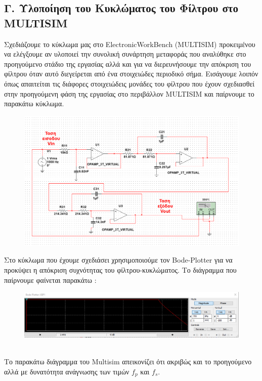 \documentclass{article}
\begin{document}
{\subsection*{Γ. Υλοποίηση του Κυκλώματος του Φίλτρου στο MULTISIM}
\large{}
Σχεδιάζουμε το κύκλωμα μας στο ElectronicWorkBench (MULTISIM) προκειμένου να ελέγξουμε αν υλοποιεί την συνολική συνάρτηση μεταφοράς που αναλύθηκε στο προηγούμενο στάδιο της εργασίας αλλά και για να διερευνήσουμε την απόκριση του φίλτρου όταν αυτό διεγείρεται από ένα στοιχειώδες περιοδικό σήμα.
Εισάγουμε λοιπόν όπως απαιτείται τις διάφορες στοιχειώδεις μονάδες του φίλτρου που έχουν σχεδιασθεί στην προηγούμενη φάση της εργασίας στο περιβάλλον MULTISIM και παίρνουμε το παρακάτω κύκλωμα.
\begin{figure}[h!]
\centering
 	\advance\leftskip-4.3cm
  \includegraphics[width=210mm,scale=2]{ylopoiisi.png}
\end{figure} 
\clearpage
Στο κύκλωμα που έχουμε σχεδιάσει χρησιμοποιούμε τον Bode-Plotter για να προκύψει η απόκριση συχνότητας του φίλτρου-κυκλώματος. Το διάγραμμα που παίρνουμε φαίνεται παρακάτω :
\begin{figure}[h!]
\centering
 	\advance\leftskip-4cm
  \includegraphics[width=200mm,scale=2]{bode_ploter.png}
\end{figure} \\
Tο παρακάτω διάγραμμα του Multisim απεικονίζει ότι ακριβώς και το προηγούμενο αλλά με δυνατότητα ανάγνωσης των τιμών $f_p$ και $f_s$.
}
\end{document}
